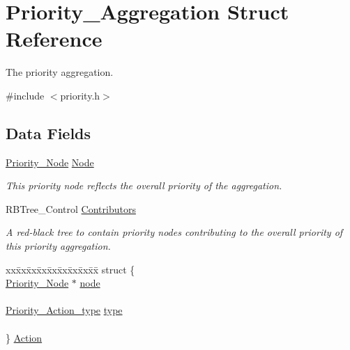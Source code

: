\hypertarget{structPriority__Aggregation}{}\section{Priority\+\_\+\+Aggregation Struct Reference}
\label{structPriority__Aggregation}


The priority aggregation.  




{\ttfamily \#include $<$priority.\+h$>$}

\subsection*{Data Fields}
\begin{DoxyCompactItemize}
\item 
\mbox{\hyperlink{structPriority__Node}{Priority\+\_\+\+Node}} \mbox{\hyperlink{structPriority__Aggregation_a9769b8a56c790588ea6994f787a03a95}{Node}}
\begin{DoxyCompactList}\small\item\em This priority node reflects the overall priority of the aggregation. \end{DoxyCompactList}\item 
\mbox{\label{structPriority__Aggregation_ac613e9072f32b777f1d0d70418631b85}} 
R\+B\+Tree\+\_\+\+Control \mbox{\hyperlink{structPriority__Aggregation_ac613e9072f32b777f1d0d70418631b85}{Contributors}}
\begin{DoxyCompactList}\small\item\em A red-\/black tree to contain priority nodes contributing to the overall priority of this priority aggregation. \end{DoxyCompactList}\item 
\mbox{\label{structPriority__Aggregation_abdbf92880fc7ccdf1e2783399de6c1cd}} 
\begin{tabbing}
xx\=xx\=xx\=xx\=xx\=xx\=xx\=xx\=xx\=\kill
struct \{\\
\>\mbox{\hyperlink{structPriority__Node}{Priority\_Node}} $\ast$ \mbox{\hyperlink{structPriority__Aggregation_ad7a1a809d64c9952f13bd1ce2047fcae}{node}}\\
\>\\
\>\mbox{\hyperlink{group__RTEMSScorePriority_gae6fceeae8a1c66316277dc3b52e3ba27}{Priority\_Action\_type}} \mbox{\hyperlink{structPriority__Aggregation_a0a325251c36aca550594dd9dbd0e9ebc}{type}}\\
\>\\
\} \mbox{\hyperlink{structPriority__Aggregation_abdbf92880fc7ccdf1e2783399de6c1cd}{Action}}\\


\end{tabbing}
\end{DoxyCompactItemize}
